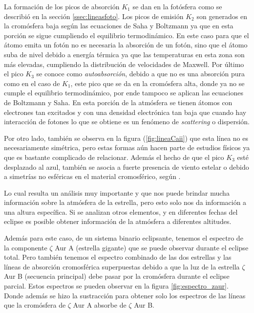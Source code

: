 \documentclass[12pt,oneside,openany,letter]{book}
\begin{document}
\noindent La formación de los picos de absorción $K_1$ se dan en la fotósfera como se describió en la sección \ref{ssec:lineasfoto}. Los picos de emisión $K_2$ son generados en la cromósfera baja según las ecuaciones de Saha y Boltzmann ya que en esta porción se sigue cumpliendo el equilibrio termodinámico. En este caso para que el átomo emita un fotón no es necesaria la absorción de un fotón, sino que el átomo suba de nivel debido a energía térmica ya que las temperaturas en esta zona son más elevadas, cumpliendo la distribución de velocidades de Maxwell. Por último el pico $K_3$ se conoce como \textit{autoabsorción}, debido a que no es una absorción pura como en el caso de $K_1$, este pico que se da en la cromósfera alta, donde ya no se cumple el equilibrio termodinámico, por ende tampoco se aplican las ecuaciones de Boltzmann y Saha. En esta porción de la atmósfera se tienen átomos con electrones tan excitados y con una densidad electrónica tan baja que cuando hay interacción de fotones lo que se obtiene es un fenómeno de \textit{scattering} o dispersión.

\noindent Por otro lado, también se observa en la figura (\ref{fig:lineaCaii}) que esta línea no es necesariamente simétrica, pero estas formas aún hacen parte de estudios físicos ya que es bastante complicado de relacionar. Además el hecho de que el pico $K_3$ esté desplazado al azul, también se asocia a fuerte presencia de viento estelar o debido a simetrías no esféricas en el material cromosférico, según \citep{linsky1980stellar}.

Lo cual resulta un análisis muy importante y que nos puede brindar mucha información sobre la atmósfera de la estrella, pero esto solo nos da información a una altura específica. Si se analizan otros elementos, y en diferentes fechas del eclipse es posible obtener información de la atmósfera a diferentes altitudes.


Además para este caso, de un sistema binario eclipsante, tenemos el espectro de la componente $\zeta$ Aur A (estrella gigante) que se puede observar durante el eclipse total. Pero también tenemos el espectro combinado de las dos estrellas y las líneas de absorción cromosférica superpuestas debido a que la luz de la estrella $\zeta$ Aur B (secuencia principal) debe pasar por la cromósfera durante el eclipse parcial. Estos espectros se pueden observar en la figura \ref{fig:espectro_zaur}. Donde además se hizo la sustracción para obtener solo los espectros de las líneas que la cromósfera de $\zeta$ Aur A absorbe de $\zeta$ Aur B.
\end{document}
